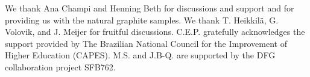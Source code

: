 \documentclass[aps,dvipsnames,twocolumn,floatfix,amsmath]{revtex4-1}
\begin{document}
\begin{acknowledgements}
We thank Ana Champi and Henning Beth for discussions and support and for providing us with the natural graphite samples.
We thank T. Heikkil\"a, G. Volovik, and J. Meijer for fruitful discussions.
 C.E.P. gratefully acknowledges
 the support provided by The Brazilian National Council for the Improvement of
 Higher Education (CAPES). M.S. and J.B-Q. are supported by the DFG
 collaboration project SFB762.
\end{acknowledgements}

\end{document}
